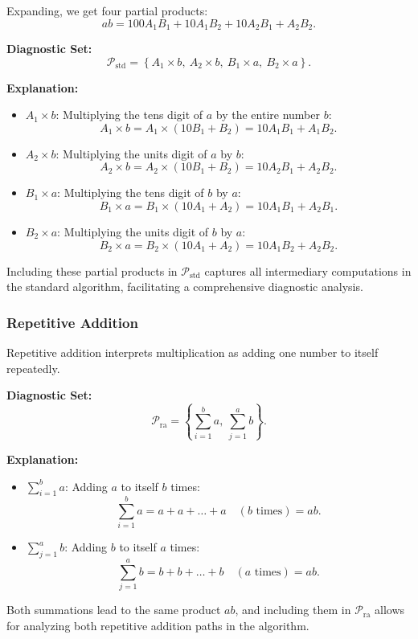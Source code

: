 \documentclass[11pt]{article}
\begin{document}
Expanding, we get four partial products:
\[
ab = 100A_1B_1 + 10A_1B_2 + 10A_2B_1 + A_2B_2.
\]

\textbf{Diagnostic Set:}
\[
\mathcal{P}_{\text{std}} = \left\{ A_1 \times b,\ A_2 \times b,\ B_1 \times a,\ B_2 \times a \right\}.
\]

\textbf{Explanation:}

\begin{itemize}
\item $A_1 \times b$: Multiplying the tens digit of $a$ by the entire number $b$:
  \[
  A_1 \times b = A_1 \times (10B_1 + B_2) = 10A_1B_1 + A_1B_2.
  \]
  
\item $A_2 \times b$: Multiplying the units digit of $a$ by $b$:
  \[
  A_2 \times b = A_2 \times (10B_1 + B_2) = 10A_2B_1 + A_2B_2.
  \]
  
\item $B_1 \times a$: Multiplying the tens digit of $b$ by $a$:
  \[
  B_1 \times a = B_1 \times (10A_1 + A_2) = 10A_1B_1 + A_2B_1.
  \]
  
\item $B_2 \times a$: Multiplying the units digit of $b$ by $a$:
  \[
  B_2 \times a = B_2 \times (10A_1 + A_2) = 10A_1B_2 + A_2B_2.
  \]
\end{itemize}

Including these partial products in $\mathcal{P}_{\text{std}}$ captures all intermediary computations in the standard algorithm, facilitating a comprehensive diagnostic analysis.

\subsubsection{Repetitive Addition}

Repetitive addition interprets multiplication as adding one number to itself repeatedly.

\textbf{Diagnostic Set:}
\[
\mathcal{P}_{\text{ra}} = \left\{ \sum_{i=1}^{b} a,\ \sum_{j=1}^{a} b \right\}.
\]

\textbf{Explanation:}

\begin{itemize}
\item $\sum_{i=1}^{b} a$: Adding $a$ to itself $b$ times:
  \[
  \sum_{i=1}^{b} a = a + a + \dots + a \quad (b \text{ times}) = ab.
  \]
  
\item $\sum_{j=1}^{a} b$: Adding $b$ to itself $a$ times:
  \[
  \sum_{j=1}^{a} b = b + b + \dots + b \quad (a \text{ times}) = ab.
  \]
\end{itemize}
Both summations lead to the same product $ab$, and including them in $\mathcal{P}_{\text{ra}}$ allows for analyzing both repetitive addition paths in the algorithm.
\end{document}
